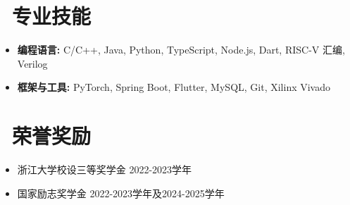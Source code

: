 \documentclass[11pt]{article}
\begin{document}
\section{\makebox[\widthof{\faCogs}][c]{\color{CVBlue}\faCogs}\ 专业技能}
\begin{itemize}[nosep]
    \item \textbf{编程语言:} C/C++, Java, Python, TypeScript, Node.js, Dart, RISC-V 汇编, Verilog
    \item \textbf{框架与工具:} PyTorch, Spring Boot, Flutter, MySQL, Git, Xilinx Vivado
\end{itemize}

\section{\makebox[\widthof{\faTrophy}][c]{\color{CVBlue}\faTrophy}\ 荣誉奖励}
\begin{itemize}
    \item 浙江大学校设三等奖学金 \hfill 2022-2023学年
    \item 国家励志奖学金 \hfill 2022-2023学年及2024-2025学年
\end{itemize}
\end{document}

